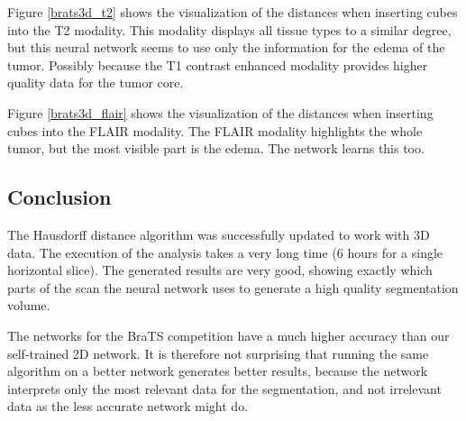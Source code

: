 Figure \ref{brats3d_t2} shows the visualization of the distances when inserting cubes into the T2 modality. This modality displays all tissue types to a similar degree, but this neural network seems to use only the information for the edema of the tumor. Possibly because the T1 contrast enhanced modality provides higher quality data for the tumor core.

Figure \ref{brats3d_flair} shows the visualization of the distances when inserting cubes into the FLAIR modality. The FLAIR modality highlights the whole tumor, but the most visible part is the edema. The network learns this too.

\subsection{Conclusion}
The Hausdorff distance algorithm was successfully updated to work with 3D data. The execution of the analysis takes a very long time (6 hours for a single horizontal slice). The generated results are very good, showing exactly which parts of the scan the neural network uses to generate a high quality segmentation volume.

The networks for the BraTS competition have a much higher accuracy than our self-trained 2D network. It is therefore not surprising that running the same algorithm on a better network generates better results, because the network interprets only the most relevant data for the segmentation, and not irrelevant data as the less accurate network might do.
